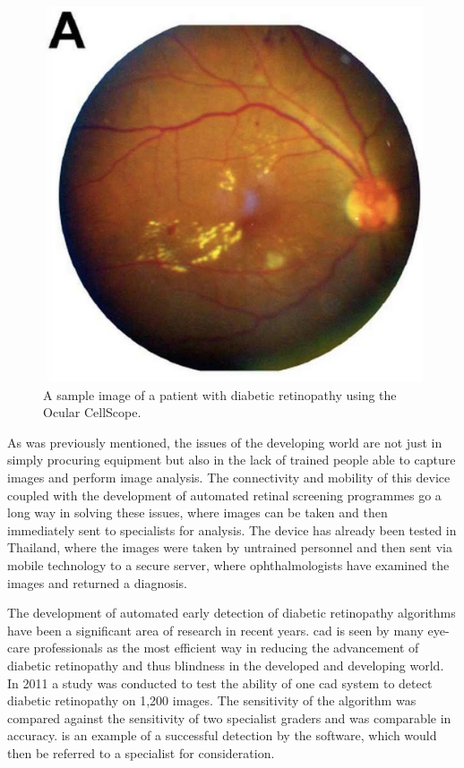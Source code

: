 \begin{figure}[H]
\centering
\includegraphics{figures/ocularDR}
\caption{A sample image of a patient with diabetic retinopathy using the Ocular
CellScope.\cite{medscape}}
\label{fig:odr}
\end{figure}

As was previously mentioned, the issues of the developing world are not just in simply
procuring equipment but also in the lack of trained people able to capture images and
perform image analysis. The connectivity and mobility of this device coupled with the
development of automated retinal screening programmes go a long way in solving these issues,
where images can be taken and then immediately sent to specialists for analysis. The
device has already been tested in Thailand, where the images were taken by untrained
personnel and then sent via mobile technology to a secure server, where ophthalmologists
have examined the images and returned a diagnosis. 

The development of automated early detection of diabetic retinopathy algorithms have
been a significant area of research in recent years. \Gls{cad}
is seen by many eye-care professionals as the most efficient way in reducing the
advancement of diabetic retinopathy and thus blindness in the developed and developing
world. In 2011 a study was conducted to test the ability of one \Gls{cad} system to detect
diabetic retinopathy on 1,200 images. The sensitivity of the algorithm was compared
against the sensitivity of two specialist graders and was comparable in accuracy.
\cite{sanchez2011evaluation}  is an example of a successful detection
by the software, which would then be referred to a specialist for consideration.

